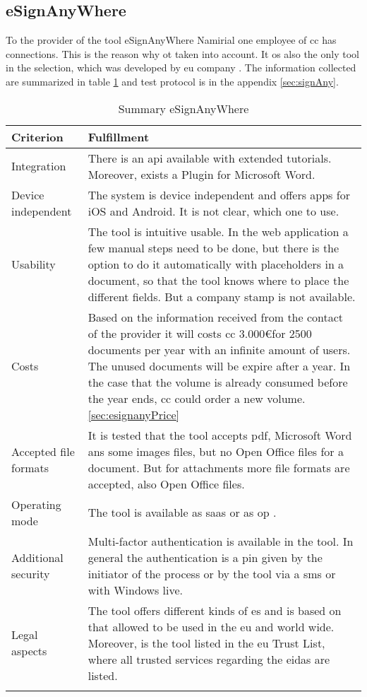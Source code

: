 \subsection{eSignAnyWhere}
To the provider of the tool eSignAnyWhere Namirial one employee of \gls{cc} has connections. This is the reason why ot taken into account. It os also the only tool in the selection, which was developed by \gls{eu} company \parencite{signAny2018contact}. The information collected are summarized in table \ref{tab:esignany} and test protocol is in the appendix \ref{sec:signAny}.
	\begin{longtable}{|p{4cm}|p{10cm}|} \hline
		Criterion & Fulfillment \\ \hline
		Integration & There is an \gls{api} available with extended tutorials. Moreover, exists a Plugin for Microsoft Word. \parencite{signAny2018api, signAny2018dev,signAny2018guide} \\ \hline
		Device independent & The system is device independent and offers \glspl{app} for iOS and Android. It is not clear, which one to use. \parencite{signAny2018info} \\ \hline
		Usability & The tool is intuitive usable. In the web application a few manual steps need to be done, but there is the option to do it automatically with placeholders in a document, so that the tool knows where to place the different fields. But a company stamp is not available. \parencite{signAny2018guide} \\ \hline
		Costs & Based on the information received from the contact of the provider it will costs \gls{cc} 3.000\euro for 2500 documents per year with an infinite amount of users. The unused documents will be expire after a year. In the case that the volume is already consumed before the year ends, \gls{cc} could order a new volume. \ref{sec:esignanyPrice} \\ \hline
		Accepted file formats & It is tested that the tool accepts \gls{pdf}, Microsoft Word ans some images files, but no Open Office files for a document. But for attachments more file formats are accepted, also Open Office files. \\ \hline
		Operating mode &  The tool is available as \gls{saas} or as \gls{op} \parencite{signAny2018business}. \\ \hline
		Additional security & Multi-factor authentication is available in the tool. In general the authentication is a pin given by the initiator of the process or by the tool via a sms or with Windows live. \parencite{signAny2018sign} \\ \hline
		Legal aspects & The tool offers different kinds of \gls{es} and is based on that allowed to be used in the \gls{eu} and world wide. Moreover, is the tool listed in the \gls{eu} Trust List, where all trusted services regarding the \gls{eidas} are listed. \parencite{signAny2018sign,signAny2018trust} \\ \hline
	\caption{Summary eSignAnyWhere}
	\label{tab:esignany}
	\end{longtable}
